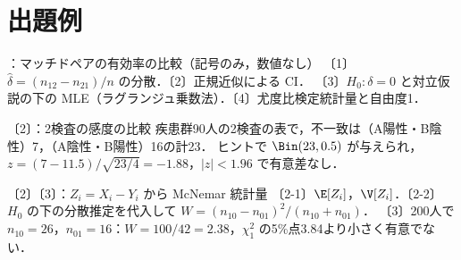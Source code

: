 \section{出題例}\label{sec:m06-shutsudai}
\begin{shutsudai}{：マッチドペアの有効率の比較（記号のみ，数値なし）}
〔1〕$\hat\delta=(n_{12}-n_{21})/n$ の分散．〔2〕正規近似による CI．
〔3〕$H_0:\delta=0$ と対立仮説の下の MLE（ラグランジュ乗数法）．〔4〕尤度比検定統計量と自由度1．
\end{shutsudai}
\begin{shutsudai}{〔2〕：2検査の感度の比較}
疾患群90人の2検査の表で，不一致は（A陽性・B陰性）7，（A陰性・B陽性）16の計23．
ヒントで $\Bin(23,0.5)$ が与えられ，$z=(7-11.5)/\sqrt{23/4}=-1.88$，$|z|<1.96$ で有意差なし．
\end{shutsudai}
\begin{shutsudai}{〔2〕〔3〕：$Z_i=X_i-Y_i$ から McNemar 統計量}
〔2-1〕$\E[Z_i]$，$\V[Z_i]$．〔2-2〕$H_0$ の下の分散推定を代入して $W=(n_{10}-n_{01})^2/(n_{10}+n_{01})$．
〔3〕200人で $n_{10}=26$，$n_{01}=16$：$W=100/42=2.38$，$\chi^2_1$ の5\%点3.84より小さく有意でない．
\end{shutsudai}

